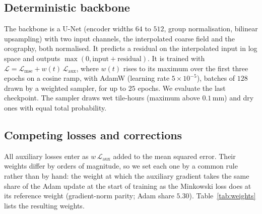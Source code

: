 \documentclass{article}
\begin{document}
\subsection{Deterministic backbone}
\label{sec:unet}
The backbone is a U-Net (encoder widths $64$ to $512$, group normalisation, bilinear upsampling) with two input
channels, the interpolated coarse field and the orography, both normalised. It predicts a residual on the
interpolated input in log space and outputs $\max(0, \text{input} + \text{residual})$. It is trained with
$\mathcal{L} = \mathcal{L}_{\mathrm{mse}} + w(t)\,\mathcal{L}_{\mathrm{aux}}$, where $w(t)$ rises to its maximum over
the first three epochs on a cosine ramp, with AdamW (learning rate $5\times10^{-5}$), batches of $128$ drawn by a
weighted sampler, for up to $25$ epochs. We evaluate the last checkpoint. The sampler draws wet tile-hours (maximum above $0.1\,\mathrm{mm}$) and dry
ones with equal total probability.

\subsection{Competing losses and corrections}
\label{sec:competing}
All auxiliary losses enter as $w\,\mathcal{L}_{\mathrm{aux}}$ added to the mean squared error. Their weights differ by
orders of magnitude, so we set each one by a common rule rather than by hand: the weight at which the auxiliary
gradient takes the same share of the Adam update at the start of training as the Minkowski loss does at its
reference weight (gradient-norm parity; Adam share $5.30$). Table~\ref{tab:weights} lists the resulting weights.
\end{document}
